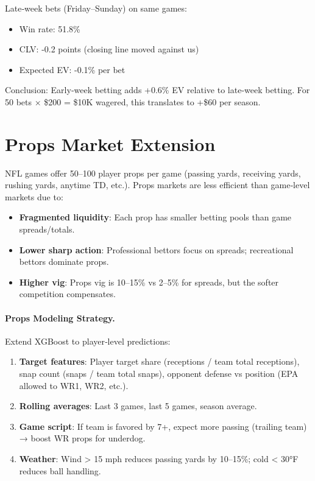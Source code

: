 Late‑week bets (Friday--Sunday) on same games:
\begin{itemize}
\item Win rate: 51.8\%
\item CLV: -0.2 points (closing line moved against us)
\item Expected EV: -0.1\% per bet
\end{itemize}

Conclusion: Early‑week betting adds +0.6\% EV relative to late‑week betting. For 50 bets × \$200 = \$10K wagered, this translates to +\$60 per season.

\section{Props Market Extension}
\label{sec:props}

NFL games offer 50--100 player props per game (passing yards, receiving yards, rushing yards, anytime TD, etc.). Props markets are less efficient than game‑level markets due to:
\begin{itemize}
\item \textbf{Fragmented liquidity}: Each prop has smaller betting pools than game spreads/totals.
\item \textbf{Lower sharp action}: Professional bettors focus on spreads; recreational bettors dominate props.
\item \textbf{Higher vig}: Props vig is 10--15\% vs 2--5\% for spreads, but the softer competition compensates.
\end{itemize}

\paragraph{Props Modeling Strategy.}
Extend XGBoost to player‑level predictions:
\begin{enumerate}
\item \textbf{Target features}: Player target share (receptions / team total receptions), snap count (snaps / team total snaps), opponent defense vs position (EPA allowed to WR1, WR2, etc.).
\item \textbf{Rolling averages}: Last 3 games, last 5 games, season average.
\item \textbf{Game script}: If team is favored by 7+, expect more passing (trailing team) → boost WR props for underdog.
\item \textbf{Weather}: Wind > 15 mph reduces passing yards by 10--15\%; cold < 30°F reduces ball handling.
\end{enumerate}

